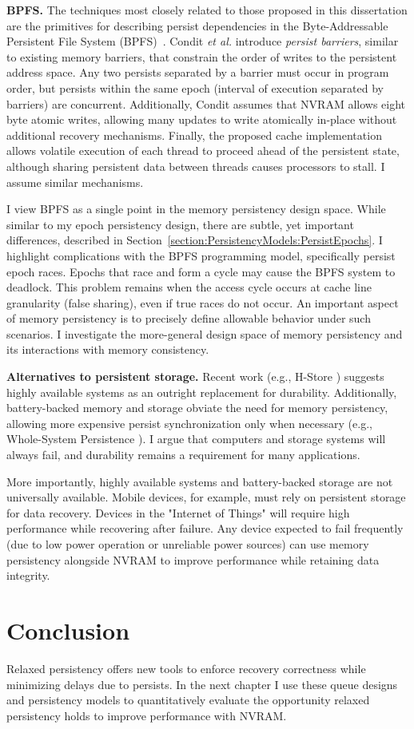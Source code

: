 \textbf{BPFS.}
The techniques most closely related to those proposed in this dissertation are the primitives for describing persist dependencies in the Byte-Addressable Persistent File System (BPFS)~\cite{ConditNightingale09}.
Condit \emph{et al.} introduce \emph{persist barriers}, similar to existing memory barriers, that constrain the order of writes to the persistent address space.
Any two persists separated by a barrier must occur in program order, but persists within the same epoch (interval of execution separated by barriers) are concurrent.
Additionally, Condit assumes that NVRAM allows eight byte atomic writes, allowing many updates to write atomically in-place without additional recovery mechanisms.
Finally, the proposed cache implementation allows volatile execution of each thread to proceed ahead of the persistent state, although sharing persistent data between threads causes processors to stall.
I assume similar mechanisms.

I view BPFS as a single point in the memory persistency design space.
While similar to my epoch persistency design, there are subtle, yet important differences, described in Section~\ref{section:PersistencyModels:PersistEpochs}.
I highlight complications with the BPFS programming model, specifically persist epoch races.
Epochs that race and form a cycle may cause the BPFS system to deadlock.
This problem remains when the access cycle occurs at cache line granularity (false sharing), even if true races do not occur.
An important aspect of memory persistency is to precisely define allowable behavior under such scenarios.
I investigate the more-general design space of memory persistency and its interactions with memory consistency.

\textbf{Alternatives to persistent storage.}
Recent work (e.g., H-Store \cite{StonebrakerMadden07}) suggests highly available systems as an outright replacement for durability.
Additionally, battery-backed memory and storage obviate the need for memory persistency, allowing more expensive persist synchronization only when necessary (e.g., Whole-System Persistence \cite{NarayananHodson12}).
I argue that computers and storage systems will always fail, and durability remains a requirement for many applications.

More importantly, highly available systems and battery-backed storage are not universally available.
Mobile devices, for example, must rely on persistent storage for data recovery.
Devices in the "Internet of Things" will require high performance while recovering after failure.
Any device expected to fail frequently (due to low power operation or unreliable power sources) can use memory persistency alongside NVRAM to improve performance while retaining data integrity.

\section{Conclusion}
\label{sec:PersistencyModels:Conclusion}

Relaxed persistency offers new tools to enforce recovery correctness while minimizing delays due to persists.
In the next chapter I use these queue designs and persistency models to quantitatively evaluate the opportunity relaxed persistency holds to improve performance with NVRAM.
